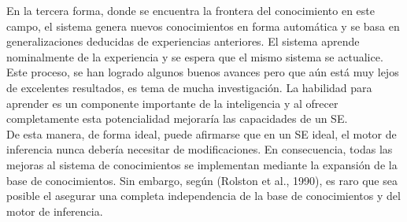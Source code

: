 En la tercera forma, donde se encuentra la frontera del conocimiento en este campo, el sistema genera nuevos conocimientos en forma automática y se basa en generalizaciones deducidas de experiencias anteriores. El sistema aprende nominalmente de la experiencia y se espera que el mismo sistema se actualice. Este proceso, se han logrado algunos buenos avances pero que aún está muy lejos de excelentes resultados, es tema de mucha investigación. La habilidad para aprender es un componente importante de la inteligencia y al ofrecer completamente esta potencialidad mejoraría las capacidades de un SE.\\
De esta manera, de forma ideal, puede afirmarse que en un SE ideal, el motor de inferencia nunca debería necesitar de modificaciones. En consecuencia, todas las mejoras al sistema de conocimientos se implementan mediante la expansión de la base de conocimientos. Sin embargo, según (Rolston et al., 1990), es raro que sea posible el asegurar una completa independencia de la base de conocimientos y del motor de inferencia.\\
